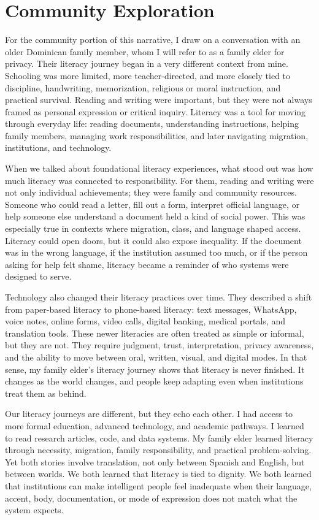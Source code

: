 \documentclass[11pt]{article}
\begin{document}
\section*{Community Exploration}

For the community portion of this narrative, I draw on a conversation with an older Dominican family member, whom I will refer to as a family elder for privacy. Their literacy journey began in a very different context from mine. Schooling was more limited, more teacher-directed, and more closely tied to discipline, handwriting, memorization, religious or moral instruction, and practical survival. Reading and writing were important, but they were not always framed as personal expression or critical inquiry. Literacy was a tool for moving through everyday life: reading documents, understanding instructions, helping family members, managing work responsibilities, and later navigating migration, institutions, and technology.

When we talked about foundational literacy experiences, what stood out was how much literacy was connected to responsibility. For them, reading and writing were not only individual achievements; they were family and community resources. Someone who could read a letter, fill out a form, interpret official language, or help someone else understand a document held a kind of social power. This was especially true in contexts where migration, class, and language shaped access. Literacy could open doors, but it could also expose inequality. If the document was in the wrong language, if the institution assumed too much, or if the person asking for help felt shame, literacy became a reminder of who systems were designed to serve.

Technology also changed their literacy practices over time. They described a shift from paper-based literacy to phone-based literacy: text messages, WhatsApp, voice notes, online forms, video calls, digital banking, medical portals, and translation tools. These newer literacies are often treated as simple or informal, but they are not. They require judgment, trust, interpretation, privacy awareness, and the ability to move between oral, written, visual, and digital modes. In that sense, my family elder's literacy journey shows that literacy is never finished. It changes as the world changes, and people keep adapting even when institutions treat them as behind.

Our literacy journeys are different, but they echo each other. I had access to more formal education, advanced technology, and academic pathways. I learned to read research articles, code, and data systems. My family elder learned literacy through necessity, migration, family responsibility, and practical problem-solving. Yet both stories involve translation, not only between Spanish and English, but between worlds. We both learned that literacy is tied to dignity. We both learned that institutions can make intelligent people feel inadequate when their language, accent, body, documentation, or mode of expression does not match what the system expects.
\end{document}
